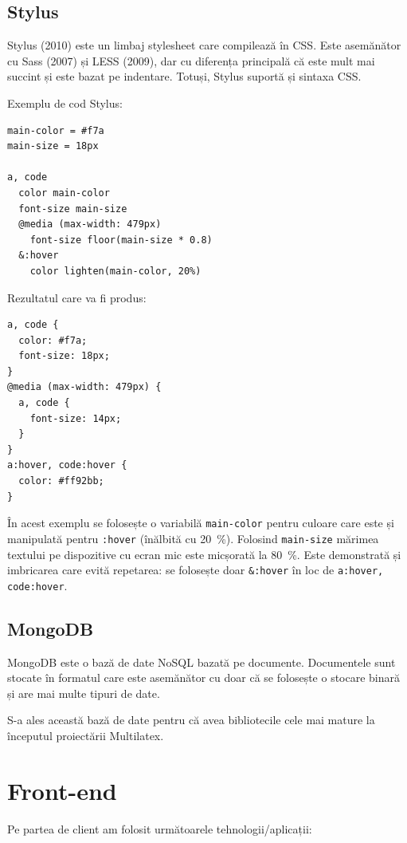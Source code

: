 \documentclass[a4wide,12pt]{report}
\newcommand{\eng}[1]{{#1}} %
\newcommand{\cod}[1]{\texttt{#1}}
\newcommand{\acr}[1]{{\textsmaller[1]{\textsc{#1}}}} %
\begin{document}
\subsection{Stylus}

Stylus (2010) este un limbaj \eng{stylesheet} care compilează în CSS. Este
asemănător cu Sass (2007) și LESS (2009), dar cu diferența principală că este
mult mai succint și este bazat pe indentare. Totuși, Stylus suportă și sintaxa
CSS.

Exemplu de cod Stylus:

\begin{verbatim}
main-color = #f7a
main-size = 18px

a, code
  color main-color
  font-size main-size
  @media (max-width: 479px)
    font-size floor(main-size * 0.8)
  &:hover
    color lighten(main-color, 20%)
\end{verbatim}

Rezultatul care va fi produs:

\begin{verbatim}
a, code {
  color: #f7a;
  font-size: 18px;
}
@media (max-width: 479px) {
  a, code { 
    font-size: 14px;
  }
}
a:hover, code:hover {
  color: #ff92bb;
}
\end{verbatim}

În acest exemplu se folosește o variabilă \cod{main-color} pentru culoare care este și
manipulată pentru \cod{:hover} (înălbită cu 20~\%). Folosind \cod{main-size}
mărimea textului pe dispozitive cu ecran mic este micșorată la 80~\%. Este
demonstrată și imbricarea care evită repetarea: se folosește doar \cod{\&:hover}
în loc de \cod{a:hover, code:hover}.

\subsection{MongoDB}

MongoDB\cite{mongodb} este o bază de date NoSQL bazată pe documente. Documentele
sunt stocate în formatul \acr{BSON} care este asemănător cu \acr{JSON} doar că
se folosește o stocare binară și are mai multe tipuri de date.

S-a ales această bază de date pentru că avea bibliotecile cele mai mature la
începutul proiectării Multilatex.

\section{\eng{Front-end}}

Pe partea de client am folosit următoarele tehnologii/aplicații:
\end{document}
